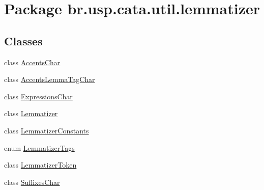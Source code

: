 \hypertarget{namespacebr_1_1usp_1_1cata_1_1util_1_1lemmatizer}{\section{Package br.\+usp.\+cata.\+util.\+lemmatizer}
\label{namespacebr_1_1usp_1_1cata_1_1util_1_1lemmatizer}
}
\subsection*{Classes}
\begin{DoxyCompactItemize}
\item 
class \hyperlink{classbr_1_1usp_1_1cata_1_1util_1_1lemmatizer_1_1_accents_char}{Accents\+Char}
\item 
class \hyperlink{classbr_1_1usp_1_1cata_1_1util_1_1lemmatizer_1_1_accents_lemma_tag_char}{Accents\+Lemma\+Tag\+Char}
\item 
class \hyperlink{classbr_1_1usp_1_1cata_1_1util_1_1lemmatizer_1_1_expressions_char}{Expressions\+Char}
\item 
class \hyperlink{classbr_1_1usp_1_1cata_1_1util_1_1lemmatizer_1_1_lemmatizer}{Lemmatizer}
\item 
class \hyperlink{classbr_1_1usp_1_1cata_1_1util_1_1lemmatizer_1_1_lemmatizer_constants}{Lemmatizer\+Constants}
\item 
enum \hyperlink{enumbr_1_1usp_1_1cata_1_1util_1_1lemmatizer_1_1_lemmatizer_tags}{Lemmatizer\+Tags}
\item 
class \hyperlink{classbr_1_1usp_1_1cata_1_1util_1_1lemmatizer_1_1_lemmatizer_token}{Lemmatizer\+Token}
\item 
class \hyperlink{classbr_1_1usp_1_1cata_1_1util_1_1lemmatizer_1_1_suffixes_char}{Suffixes\+Char}
\end{DoxyCompactItemize}
